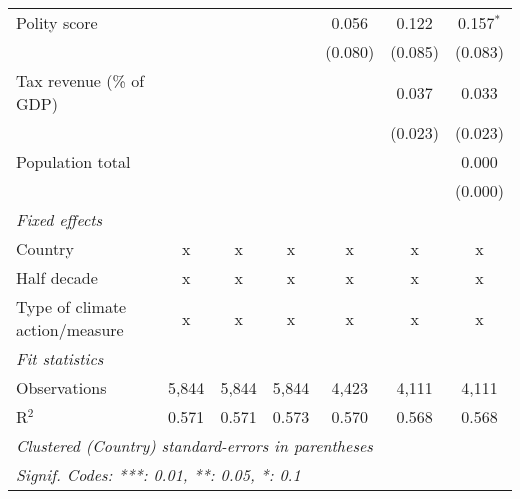 \begin{tabular}{lcccccc}
   Polity score                                                          &         &                &                & 0.056          & 0.122          & 0.157$^{*}$\\   
                                                                         &         &                &                & (0.080)        & (0.085)        & (0.083)\\   
   Tax revenue (\% of GDP)                                               &         &                &                &                & 0.037          & 0.033\\   
                                                                         &         &                &                &                & (0.023)        & (0.023)\\   
   Population total                                                      &         &                &                &                &                & 0.000\\   
                                                                         &         &                &                &                &                & (0.000)\\   
   \emph{Fixed effects}\\
   Country                                                               & x       & x              & x              & x              & x              & x\\  
   Half decade                                                           & x       & x              & x              & x              & x              & x\\  
   Type of climate action/measure                                        & x       & x              & x              & x              & x              & x\\  
   \midrule \emph{Fit statistics}\\
   Observations                                                          & 5,844   & 5,844          & 5,844          & 4,423          & 4,111          & 4,111\\  
   R$^2$                                                                 & 0.571   & 0.571          & 0.573          & 0.570          & 0.568          & 0.568\\  
   \midrule
   \multicolumn{7}{l}{\emph{Clustered (Country) standard-errors in parentheses}}\\
   \multicolumn{7}{l}{\emph{Signif. Codes: ***: 0.01, **: 0.05, *: 0.1}}\\
\end{tabular}
\par\endgroup


